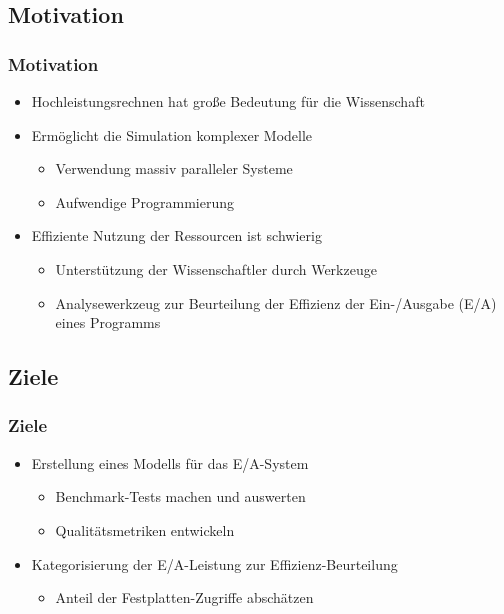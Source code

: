 \documentclass{beamer}
\begin{document}
\subsection{Motivation}
\begin{frame}
\frametitle{Motivation}
\begin{itemize}
	\item Hochleistungsrechnen hat große Bedeutung für die Wissenschaft
	\item Ermöglicht die Simulation komplexer Modelle
	\begin{itemize}
		\item Verwendung massiv paralleler Systeme
		\item Aufwendige Programmierung
	\end{itemize}	
	\item Effiziente Nutzung der Ressourcen ist schwierig
	\begin{itemize}
		\item Unterstützung der Wissenschaftler durch Werkzeuge
		\item Analysewerkzeug zur Beurteilung der Effizienz der Ein-/Ausgabe (E/A) eines Programms
	\end{itemize}			
\end{itemize}
\end{frame}

\subsection{Ziele}
\begin{frame}
\frametitle{Ziele}
	\begin{itemize}
		\item Erstellung eines Modells für das E/A-System
		\begin{itemize}
			\item Benchmark-Tests machen und auswerten
			\item Qualitätsmetriken entwickeln
		\end{itemize}	
		\item Kategorisierung der E/A-Leistung zur Effizienz-Beurteilung 
		\begin{itemize}
			\item Anteil der Festplatten-Zugriffe abschätzen
		\end{itemize}	
	\end{itemize}	
\end{frame}
\end{document}
